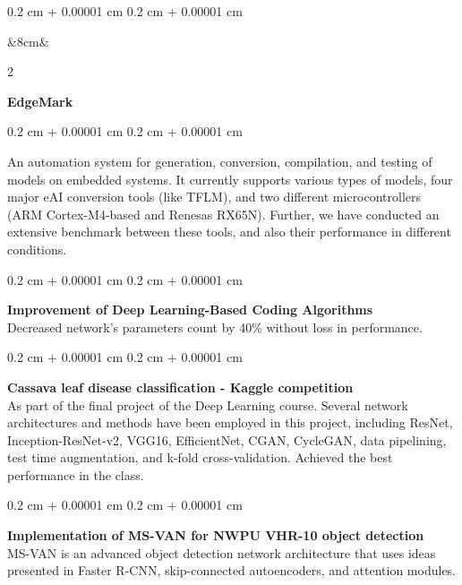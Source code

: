 \documentclass[10pt, letterpaper]{article}
\newlength{\twocolrightwidth}
\newenvironment{onecolentry}{
    \begin{adjustwidth}{
        0.2 cm + 0.00001 cm
    }{
        0.2 cm + 0.00001 cm
    }
}{
    \end{adjustwidth}
} %
\newenvironment{twocolentry}[2][]{
    \onecolentry
    \ifx&#1&%
        \setlength{\twocolrightwidth}{4.5cm}%
    \else
        \setlength{\twocolrightwidth}{#1}%
    \fi
    \def\secondColumn{#2}
    \setcolumnwidth{\fill, \twocolrightwidth}
    \begin{paracol}{2}
}{
    \switchcolumn \raggedleft \secondColumn
    \end{paracol}
    \endonecolentry
} %
\let\hrefWithoutArrow\href
\renewcommand{\href}[2]{\hrefWithoutArrow{#1}{\ifthenelse{\equal{#2}{}}{ }{#2 }\raisebox{.15ex}{\footnotesize \faExternalLink*}}}
\begin{document}
        \begin{twocolentry}[8cm]{\href{https://github.com/Black3rror/EdgeMark}{GitHub}}
            \textbf{EdgeMark}
        \end{twocolentry}
        \vspace{0.1 cm}
        \begin{onecolentry}
            An automation system for generation, conversion, compilation, and testing of models on embedded systems. It currently supports various types of models, four major eAI conversion tools (like TFLM), and two different microcontrollers (ARM Cortex-M4-based and Renesas RX65N). Further, we have conducted an extensive benchmark between these tools, and also their performance in different conditions.
        \end{onecolentry}

        \vspace{0.2 cm}

        \begin{onecolentry}
            \textbf{Improvement of Deep Learning-Based Coding Algorithms}\\
            Decreased network’s parameters count by 40\% without loss in performance.
        \end{onecolentry}


        \vspace{0.2 cm}

        
        \begin{onecolentry}
            \textbf{Cassava leaf disease classification - Kaggle competition}\\
            As part of the final project of the Deep Learning course. Several network architectures and methods have been employed in this project, including ResNet, Inception-ResNet-v2, VGG16, EfficientNet, CGAN, CycleGAN, data pipelining, test time augmentation, and k-fold cross-validation. Achieved the best performance in the class.
        \end{onecolentry}


        \vspace{0.2 cm}

        
        \begin{onecolentry}
            \textbf{Implementation of MS-VAN for NWPU VHR-10 object detection}\\
            MS-VAN is an advanced object detection network architecture that uses ideas presented in Faster R-CNN, skip-connected autoencoders, and attention modules.
        \end{onecolentry}
\end{document}

